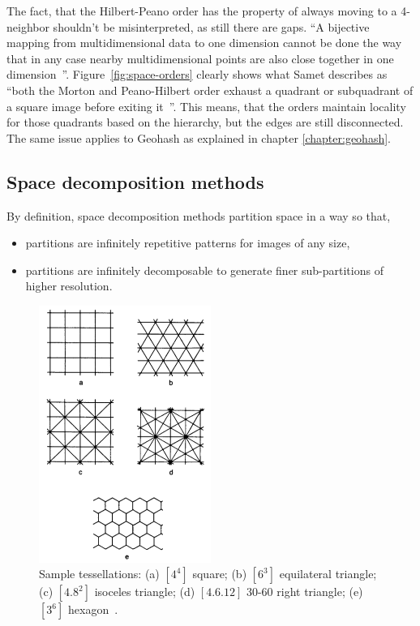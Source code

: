 The fact, that the Hilbert-Peano order has the property of always moving to a 4-neighbor shouldn't be misinterpreted, as still there are gaps. ``A bijective mapping from multidimensional data to one dimension cannot be done the way that in any case nearby multidimensional points are also close together in one dimension~\cite{Tropf81multidimensional}''. Figure~\ref{fig:space-orders} clearly shows what Samet describes as ``both the Morton and Peano-Hilbert order exhaust a quadrant or subquadrant of a square image before exiting it~\cite{Samet90spatialdata}''. This means, that the orders maintain locality for those quadrants based on the hierarchy, but the edges are still disconnected. The same issue applies to Geohash as explained in chapter \ref{chapter:geohash}.


\subsection{Space decomposition methods}

By definition, space decomposition methods partition space in a way so that,
\begin{itemize}
\item partitions are infinitely repetitive patterns for images of any size,
\item partitions are infinitely decomposable to generate finer sub-partitions of higher resolution.~\cite{Samet90spatialdata}
\end{itemize}

\begin{figure}[h]
  \begin{center}
    \includegraphics[width=0.5\textwidth]{figures/space_decompositions.png}
    \caption{Sample tessellations: (a) $[4^4]$ square; (b) $[6^3]$ equilateral triangle; (c) $[4.8^2]$ isoceles triangle; (d) $[4.6.12]$ 30-60 right triangle; (e) $[3^6]$ hexagon~\cite[p 17]{Samet90spatialdata}.}
    \label{fig:space-decompositions}
  \end{center}
\end{figure}

